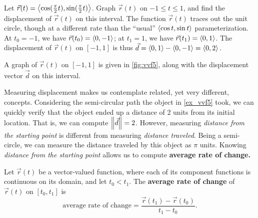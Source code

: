 \begin{example}\label{ex_vvf5}%
Let $\vec r(t) =\left\langle \cos (\frac{\pi}{2}t),\sin (\frac{\pi}2 t)\right\rangle$. Graph $\vec r(t)$ on $-1\leq t\leq 1$, and find the displacement of $\vec r(t)$ on this interval.
\solution
%
%
The function $\vec r(t)$ traces out the unit circle, though at a different rate than the ``usual'' $\left\langle \cos t,\sin t\right\rangle$ parameterization. At $t_0=-1$, we have $\vec r(t_0) =\left\langle 0,-1\right\rangle$; at $t_1=1$, we have $\vec r(t_1) =\left\langle 0,1\right\rangle$. The displacement of $\vec r(t)$ on $[-1,1]$ is thus $\vec d =\left\langle 0,1\right\rangle-\left\langle 0,-1\right\rangle=\left\langle 0,2\right\rangle.$

A graph of $\vec r(t)$ on $[-1,1]$ is given in \autoref{fig:vvf5}, along with the displacement vector $\vec d$ on this interval.
\end{example}

Measuring displacement makes us contemplate related, yet very different, concepts. Considering the semi-circular path the object in \autoref{ex_vvf5} took, we can quickly verify that the object ended up a distance of 2 units from its initial location. That is, we can compute $\left\lVert \vec d \right\rVert = 2$. However, measuring \emph{distance from the starting point} is different from measuring \emph{distance traveled}. Being a semi-circle, we can measure the distance traveled by this object as $\pi%
$ units. Knowing \emph{distance from the starting point} allows us to compute \textbf{average rate of change.}

\begin{definition}\label{def:av_rate_of_change_vect}%
Let $\vec r(t)$ be a vector-valued function, where each of its component functions is continuous on its domain, and let $t_0<t_1$. The \textbf{average rate of change} of $\vec r(t)$ on $[t_0,t_1]$ is
\[\text{average rate of change} = \frac{\vec r(t_1) - \vec r(t_0)}{t_1-t_0}.\]
\end{definition}

